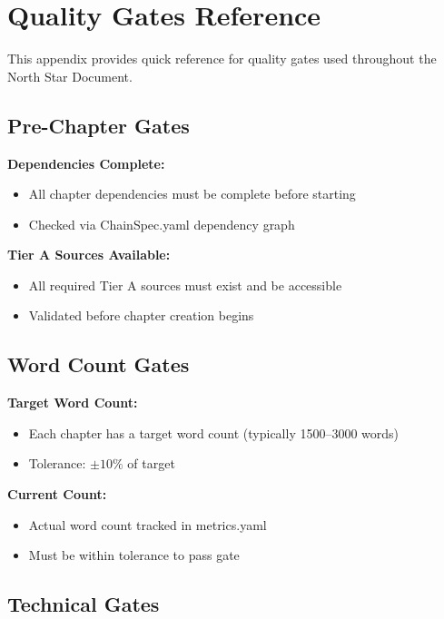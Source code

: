 
\chapter{Quality Gates Reference}

This appendix provides quick reference for quality gates used throughout the North Star Document.

\section*{Pre-Chapter Gates}

\textbf{Dependencies Complete:}
\begin{itemize}
    \item All chapter dependencies must be complete before starting
    \item Checked via ChainSpec.yaml dependency graph
\end{itemize}

\textbf{Tier A Sources Available:}
\begin{itemize}
    \item All required Tier A sources must exist and be accessible
    \item Validated before chapter creation begins
\end{itemize}

\section*{Word Count Gates}

\textbf{Target Word Count:}
\begin{itemize}
    \item Each chapter has a target word count (typically 1500--3000 words)
    \item Tolerance: $\pm 10\%$ of target
\end{itemize}

\textbf{Current Count:}
\begin{itemize}
    \item Actual word count tracked in metrics.yaml
    \item Must be within tolerance to pass gate
\end{itemize}

\section*{Technical Gates}

